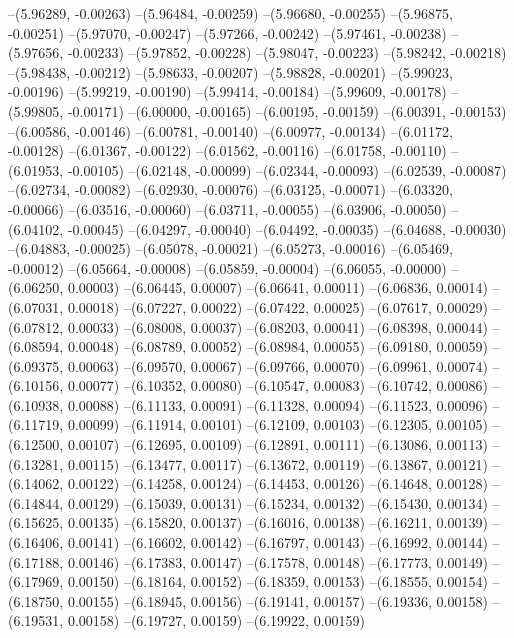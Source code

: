 --(5.96289, -0.00263)
--(5.96484, -0.00259)
--(5.96680, -0.00255)
--(5.96875, -0.00251)
--(5.97070, -0.00247)
--(5.97266, -0.00242)
--(5.97461, -0.00238)
--(5.97656, -0.00233)
--(5.97852, -0.00228)
--(5.98047, -0.00223)
--(5.98242, -0.00218)
--(5.98438, -0.00212)
--(5.98633, -0.00207)
--(5.98828, -0.00201)
--(5.99023, -0.00196)
--(5.99219, -0.00190)
--(5.99414, -0.00184)
--(5.99609, -0.00178)
--(5.99805, -0.00171)
--(6.00000, -0.00165)
--(6.00195, -0.00159)
--(6.00391, -0.00153)
--(6.00586, -0.00146)
--(6.00781, -0.00140)
--(6.00977, -0.00134)
--(6.01172, -0.00128)
--(6.01367, -0.00122)
--(6.01562, -0.00116)
--(6.01758, -0.00110)
--(6.01953, -0.00105)
--(6.02148, -0.00099)
--(6.02344, -0.00093)
--(6.02539, -0.00087)
--(6.02734, -0.00082)
--(6.02930, -0.00076)
--(6.03125, -0.00071)
--(6.03320, -0.00066)
--(6.03516, -0.00060)
--(6.03711, -0.00055)
--(6.03906, -0.00050)
--(6.04102, -0.00045)
--(6.04297, -0.00040)
--(6.04492, -0.00035)
--(6.04688, -0.00030)
--(6.04883, -0.00025)
--(6.05078, -0.00021)
--(6.05273, -0.00016)
--(6.05469, -0.00012)
--(6.05664, -0.00008)
--(6.05859, -0.00004)
--(6.06055, -0.00000)
--(6.06250, 0.00003)
--(6.06445, 0.00007)
--(6.06641, 0.00011)
--(6.06836, 0.00014)
--(6.07031, 0.00018)
--(6.07227, 0.00022)
--(6.07422, 0.00025)
--(6.07617, 0.00029)
--(6.07812, 0.00033)
--(6.08008, 0.00037)
--(6.08203, 0.00041)
--(6.08398, 0.00044)
--(6.08594, 0.00048)
--(6.08789, 0.00052)
--(6.08984, 0.00055)
--(6.09180, 0.00059)
--(6.09375, 0.00063)
--(6.09570, 0.00067)
--(6.09766, 0.00070)
--(6.09961, 0.00074)
--(6.10156, 0.00077)
--(6.10352, 0.00080)
--(6.10547, 0.00083)
--(6.10742, 0.00086)
--(6.10938, 0.00088)
--(6.11133, 0.00091)
--(6.11328, 0.00094)
--(6.11523, 0.00096)
--(6.11719, 0.00099)
--(6.11914, 0.00101)
--(6.12109, 0.00103)
--(6.12305, 0.00105)
--(6.12500, 0.00107)
--(6.12695, 0.00109)
--(6.12891, 0.00111)
--(6.13086, 0.00113)
--(6.13281, 0.00115)
--(6.13477, 0.00117)
--(6.13672, 0.00119)
--(6.13867, 0.00121)
--(6.14062, 0.00122)
--(6.14258, 0.00124)
--(6.14453, 0.00126)
--(6.14648, 0.00128)
--(6.14844, 0.00129)
--(6.15039, 0.00131)
--(6.15234, 0.00132)
--(6.15430, 0.00134)
--(6.15625, 0.00135)
--(6.15820, 0.00137)
--(6.16016, 0.00138)
--(6.16211, 0.00139)
--(6.16406, 0.00141)
--(6.16602, 0.00142)
--(6.16797, 0.00143)
--(6.16992, 0.00144)
--(6.17188, 0.00146)
--(6.17383, 0.00147)
--(6.17578, 0.00148)
--(6.17773, 0.00149)
--(6.17969, 0.00150)
--(6.18164, 0.00152)
--(6.18359, 0.00153)
--(6.18555, 0.00154)
--(6.18750, 0.00155)
--(6.18945, 0.00156)
--(6.19141, 0.00157)
--(6.19336, 0.00158)
--(6.19531, 0.00158)
--(6.19727, 0.00159)
--(6.19922, 0.00159)

